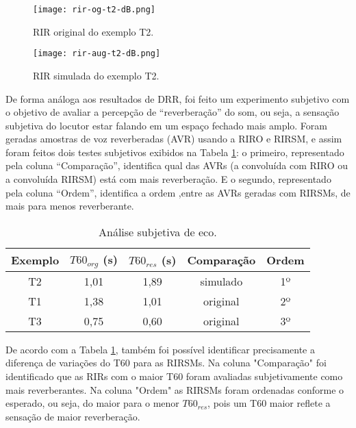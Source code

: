 \begin{figure} [H]
    \centering
    \texttt{[image: rir-og-t2-dB.png]}
    \caption{RIR original do exemplo T2.}
    \label{fig:rir-og-t2}
\end{figure} 

\begin{figure} [H]
    \centering
    \texttt{[image: rir-aug-t2-dB.png]}
    \caption{RIR simulada do exemplo T2.}
    \label{fig:rir-aug-t2}
\end{figure} 

De forma análoga aos resultados de DRR, foi feito um experimento subjetivo com o objetivo de avaliar a percepção de “reverberação” do som, ou seja,
a sensação subjetiva do locutor estar falando em um espaço fechado mais amplo.
Foram geradas amostras de voz reverberadas (AVR) usando a RIRO e RIRSM, e assim foram feitos dois testes subjetivos exibidos na Tabela \ref{tbl:t60-exp}:
o primeiro, representado pela coluna “Comparação”, identifica qual das AVRs (a convoluída com RIRO ou a convoluída RIRSM) está com mais reverberação.
E o segundo, representado pela coluna “Ordem”, identifica a ordem ,entre as AVRs geradas com RIRSMs, de mais para menos reverberante.

\begin{table} [H]
    \centering
    \caption{Análise subjetiva de eco.}
    \label{tbl:t60-exp}
    \begin{tabular}{c|c|c|c|c}

        \textbf{Exemplo} & 
        \textbf{$T60_{org}$ (s)} & 
        \textbf{$T60_{res}$ (s)} & 
        \textbf{Comparação} &
        \textbf{Ordem} \\
        \hline 

        T2 & 1,01 & 1,89 & simulado & 1º \\
        T1 & 1,38 & 1,01 & original & 2º \\
        T3 & 0,75 & 0,60 & original & 3º \\

    \end{tabular}
\end{table}

De acordo com a Tabela \ref{tbl:t60-exp}, também foi possível identificar precisamente a diferença de variações do T60 para as RIRSMs.
Na coluna "Comparação" foi identificado que as RIRs com o maior T60 foram avaliadas subjetivamente como mais reverberantes.
Na coluna "Ordem" as RIRSMs foram ordenadas conforme o esperado, ou seja, do maior para o menor $T60_{res}$, pois um T60 maior reflete a sensação
de maior reverberação.

